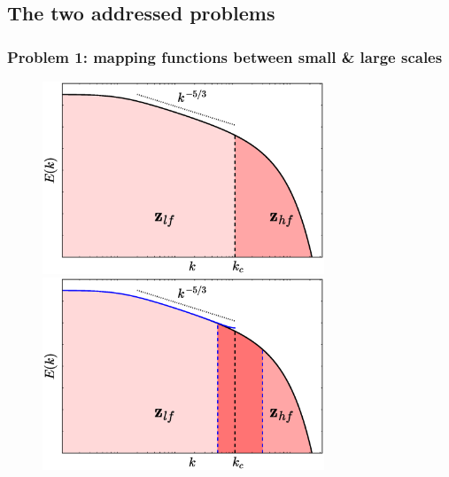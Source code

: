 \documentclass{beamer}
\begin{document}
\subsection[The two problems]{The two addressed problems}
\begin{frame}
\frametitle{Problem 1: mapping functions between small \& large scales}

	\begin{figure}
		\begin{overprint}
			\centerline{\includegraphics[width=0.75\textwidth]{./figures/turbulence/turbulence_spectra_long}}
			\centerline{\includegraphics[width=0.75\textwidth]{./figures/turbulence/turbulence_spectra_long_alias}}			
		\end{overprint}	
	\end{figure}
\end{frame}
\end{document}
